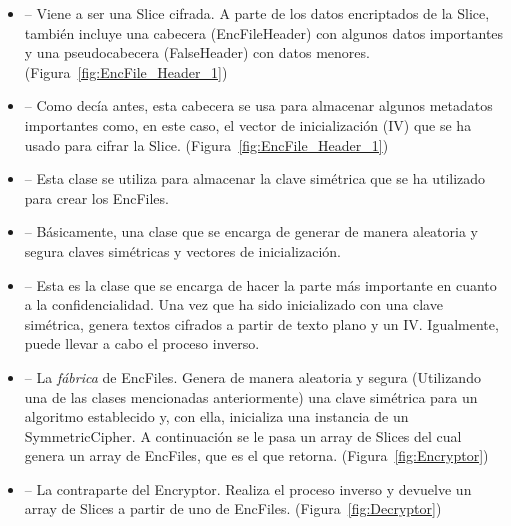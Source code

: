 \begin{itemize}
  \item {} -- Viene a ser una Slice cifrada. A parte de los datos
  encriptados de la Slice, también incluye una cabecera (EncFileHeader) con
  algunos datos importantes y una pseudocabecera (FalseHeader) con datos menores.
  (Figura~\ref{fig:EncFile_Header_1})

  \item {} -- Como decía antes, esta cabecera se usa para
  almacenar algunos metadatos importantes como, en este caso, el vector de
  inicialización (IV) que se ha usado para cifrar la Slice.
  (Figura~\ref{fig:EncFile_Header_1})

  \item {} -- Esta clase se utiliza para almacenar la clave
  simétrica que se ha utilizado para crear los EncFiles.

  \item {} -- Básicamente, una clase que se encarga de
  generar de manera aleatoria y segura claves simétricas y vectores de
  inicialización.

  \item {} -- Esta es la clase que se encarga de hacer
  la parte más importante en cuanto a la confidencialidad. Una vez que ha sido
  inicializado con una clave simétrica, genera textos cifrados a partir de
  texto plano y un IV. Igualmente, puede llevar a cabo el proceso inverso.

  \item {} -- La \emph{fábrica} de EncFiles. Genera de manera
  aleatoria y segura (Utilizando una de las clases mencionadas anteriormente)
  una clave simétrica para un algoritmo establecido y, con ella, inicializa una
  instancia de un SymmetricCipher. A continuación se le pasa un array de Slices
  del cual genera un array de EncFiles, que es el que retorna.
  (Figura~\ref{fig:Encryptor})

  \item {} -- La contraparte del Encryptor. Realiza el proceso
  inverso y devuelve un array de Slices a partir de uno de EncFiles.
  (Figura~\ref{fig:Decryptor})
\end{itemize}

